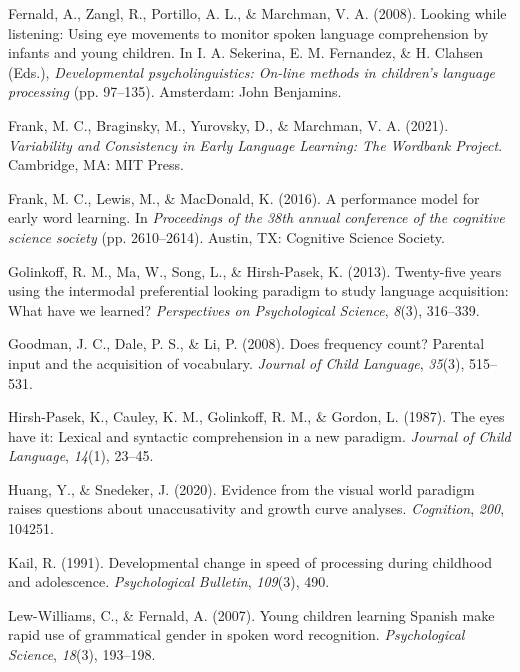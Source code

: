 \documentclass[10pt, letterpaper]{article}
\begin{document}
\leavevmode\hypertarget{ref-Fernald2008}{}%
Fernald, A., Zangl, R., Portillo, A. L., \& Marchman, V. A. (2008).
Looking while listening: Using eye movements to monitor spoken language
comprehension by infants and young children. In I. A. Sekerina, E. M.
Fernandez, \& H. Clahsen (Eds.), \emph{Developmental psycholinguistics:
On-line methods in children's language processing} (pp. 97--135).
Amsterdam: John Benjamins.

\leavevmode\hypertarget{ref-frank2021}{}%
Frank, M. C., Braginsky, M., Yurovsky, D., \& Marchman, V. A. (2021).
\emph{Variability and Consistency in Early Language Learning: The
Wordbank Project}. Cambridge, MA: MIT Press.

\leavevmode\hypertarget{ref-frank2016b}{}%
Frank, M. C., Lewis, M., \& MacDonald, K. (2016). A performance model
for early word learning. In \emph{Proceedings of the 38th annual
conference of the cognitive science society} (pp. 2610--2614). Austin,
TX: Cognitive Science Society.

\leavevmode\hypertarget{ref-Golinkoff2013}{}%
Golinkoff, R. M., Ma, W., Song, L., \& Hirsh-Pasek, K. (2013).
Twenty-five years using the intermodal preferential looking paradigm to
study language acquisition: What have we learned? \emph{Perspectives on
Psychological Science}, \emph{8}(3), 316--339.

\leavevmode\hypertarget{ref-Goodman2008}{}%
Goodman, J. C., Dale, P. S., \& Li, P. (2008). Does frequency count?
Parental input and the acquisition of vocabulary. \emph{Journal of Child
Language}, \emph{35}(3), 515--531.

\leavevmode\hypertarget{ref-Hirsh-Pasek1987}{}%
Hirsh-Pasek, K., Cauley, K. M., Golinkoff, R. M., \& Gordon, L. (1987).
The eyes have it: Lexical and syntactic comprehension in a new paradigm.
\emph{Journal of Child Language}, \emph{14}(1), 23--45.

\leavevmode\hypertarget{ref-Huang2020}{}%
Huang, Y., \& Snedeker, J. (2020). Evidence from the visual world
paradigm raises questions about unaccusativity and growth curve
analyses. \emph{Cognition}, \emph{200}, 104251.

\leavevmode\hypertarget{ref-kail1991}{}%
Kail, R. (1991). Developmental change in speed of processing during
childhood and adolescence. \emph{Psychological Bulletin}, \emph{109}(3),
490.

\leavevmode\hypertarget{ref-Lew-Williams2007}{}%
Lew-Williams, C., \& Fernald, A. (2007). Young children learning Spanish
make rapid use of grammatical gender in spoken word recognition.
\emph{Psychological Science}, \emph{18}(3), 193--198.
\end{document}
